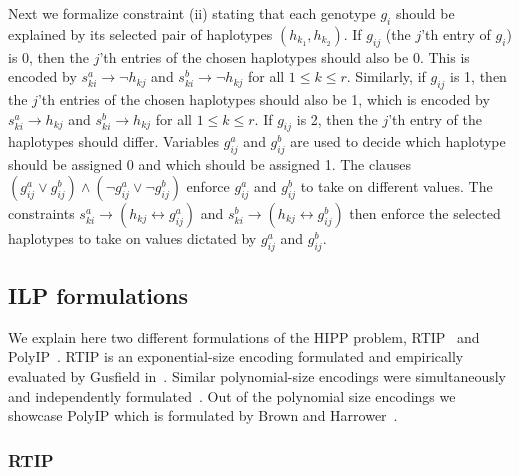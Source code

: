 \documentclass[12pt,a4paper]{article}
\begin{document}
Next we formalize constraint (ii) stating that each genotype $g_i$ should be explained by its selected pair of haplotypes $(h_{k_1}, h_{k_2})$.
If $g_{ij}$ (the $j$'th entry of $g_i$) is 0, then the $j$'th entries of the chosen haplotypes should also be 0.
This is encoded by $s^a_{ki}\rightarrow\neg h_{kj}$ and $s^b_{ki}\rightarrow\neg h_{kj}$ for all $1\leq k \leq r$.
Similarly, if $g_{ij}$ is 1, then the $j$'th entries of the chosen haplotypes should also be 1, which is encoded by $s^a_{ki}\rightarrow h_{kj}$ and $s^b_{ki}\rightarrow h_{kj}$ for all $1\leq k \leq r$.
If $g_{ij}$ is 2, then the $j$'th entry of the haplotypes should differ.
Variables $g^a_{ij}$ and $g^b_{ij}$ are used to decide which haplotype should be assigned 0 and which should be assigned 1.
The clauses $(g^a_{ij}\vee g^b_{ij})\wedge(\neg g^a_{ij}\vee \neg g^b_{ij})$ enforce $g^a_{ij}$ and $g^b_{ij}$ to take on different values.
The constraints $s^a_{ki}\rightarrow (h_{kj}\leftrightarrow g^a_{ij})$ and $s^b_{ki}\rightarrow (h_{kj}\leftrightarrow g^b_{ij})$ then enforce the selected haplotypes to take on values dictated by $g^a_{ij}$ and $g^b_{ij}$.
\subsection{ILP formulations}
We explain here two different formulations of the HIPP problem, RTIP~\cite{DBLP:conf/cpm/Gusfield03} and PolyIP~\cite{DBLP:journals/tcbb/BrownH06}.
RTIP is an exponential-size encoding formulated and empirically evaluated by Gusfield in~\cite{DBLP:conf/cpm/Gusfield03}.
Similar polynomial-size encodings were simultaneously and independently formulated~\cite{DBLP:journals/tcbb/BrownH06, DBLP:conf/recomb/HalldorssonBELYI02, DBLP:journals/informs/LanciaPR04}.
Out of the polynomial size encodings we showcase PolyIP which is formulated by Brown and Harrower~\cite{DBLP:journals/tcbb/BrownH06}.

\subsubsection{RTIP}
\end{document}
